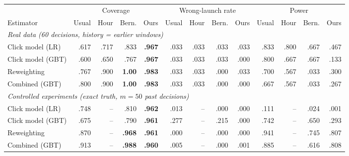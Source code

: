 \begin{tabular}{lrrrrrrrrrrrr}
\toprule
& \multicolumn{4}{c}{Coverage} & \multicolumn{4}{c}{Wrong-launch rate} & \multicolumn{4}{c}{Power} \\
\cmidrule(lr){2-5}\cmidrule(lr){6-9}\cmidrule(lr){10-13}
Estimator & Usual & Hour & Bern. & Ours & Usual & Hour & Bern. & Ours & Usual & Hour & Bern. & Ours \\
\midrule
\multicolumn{13}{l}{\emph{Real data (60 decisions, history = earlier windows)}} \\
Click model (LR) & .617 & .717 & .833 & \textbf{.967} & .033 & .033 & .033 & .033 & .833 & .800 & .667 & .467 \\
Click model (GBT) & .600 & .650 & .767 & \textbf{.967} & .033 & .033 & .033 & .000 & .800 & .667 & .667 & .133 \\
Reweighting & .767 & .900 & \textbf{1.00} & \textbf{.983} & .033 & .033 & .000 & .033 & .700 & .567 & .033 & .300 \\
Combined (GBT) & .800 & .900 & \textbf{1.00} & \textbf{.983} & .033 & .033 & .000 & .000 & .667 & .567 & .033 & .267 \\
\midrule
\multicolumn{13}{l}{\emph{Controlled experiments (exact truth, $m=50$ past decisions)}} \\
Click model (LR) & .748 & -- & .810 & \textbf{.962} & .013 & -- & .000 & .000 & .111 & -- & .024 & .001 \\
Click model (GBT) & .675 & -- & .790 & \textbf{.961} & .277 & -- & .215 & .000 & .742 & -- & .650 & .293 \\
Reweighting & .870 & -- & \textbf{.968} & \textbf{.961} & .000 & -- & .000 & .000 & .941 & -- & .745 & .807 \\
Combined (GBT) & .913 & -- & \textbf{.988} & \textbf{.960} & .005 & -- & .000 & .001 & .885 & -- & .616 & .808 \\
\bottomrule
\end{tabular}
